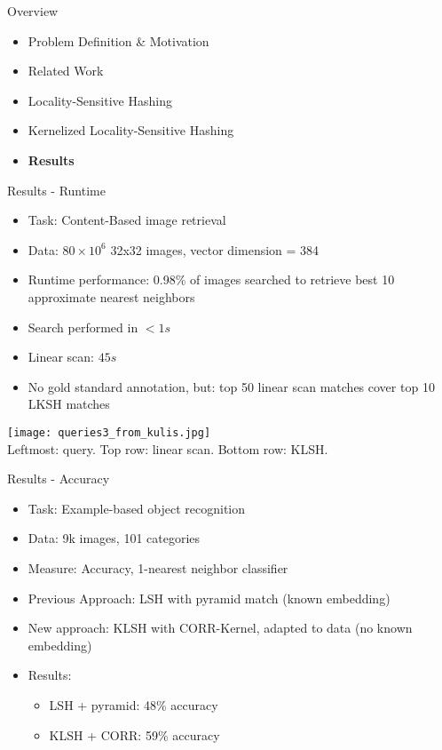 \documentclass[12pt,a4paper]{beamer}
\begin{document}
\begin{frame}{Overview}
\begin{itemize}
\item Problem Definition \& Motivation
\item Related Work
\item Locality-Sensitive Hashing
\item Kernelized Locality-Sensitive Hashing
\item \textbf{Results}
\end{itemize}
\end{frame}

\begin{frame}{Results - Runtime}
\begin{itemize}
\item Task: Content-Based image retrieval
\item Data: $80\times 10^6$ 32x32 images, vector dimension = 384
\item Runtime performance: 0.98\% of images searched to retrieve best 10 approximate nearest neighbors
\item Search performed in $<1s$
\item Linear scan: $45s$
\item No gold standard annotation, but: top 50 linear scan matches cover top 10 LKSH matches
\end{itemize}
\end{frame}

\begin{frame}
\texttt{[image: queries3\_from\_kulis.jpg]}\\
Leftmost: query. Top row: linear scan. Bottom row: KLSH.
\end{frame}

\begin{frame}{Results - Accuracy}
\begin{itemize}
\item Task: Example-based object recognition
\item Data: 9k images, 101 categories
\item Measure: Accuracy, 1-nearest neighbor classifier
\item Previous Approach: LSH with pyramid match (known embedding)
\item New approach: KLSH with CORR-Kernel, adapted to data (no known embedding)
\item Results:
\begin{itemize}
    \item LSH + pyramid: 48\% accuracy
    \item KLSH + CORR: 59\% accuracy
\end{itemize}
\end{itemize}
\end{frame}
\end{document}

